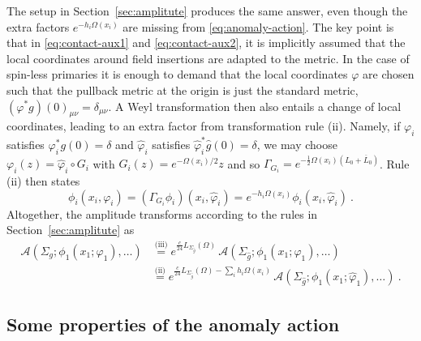 \documentclass[11pt,a4paper]{article}
\numberwithin{equation}{section}
\begin{document}
The setup in Section~\ref{sec:amplitute} produces the same answer, even though the extra factors $e^{-h_i\Omega(x_i)}$ are missing from \eqref{eq:anomaly-action}.
The key point is that in \eqref{eq:contact-aux1} and \eqref{eq:contact-aux2}, it is implicitly assumed that the local coordinates around field insertions are adapted to the metric. In the case of spin-less primaries it is enough to demand that the local coordinates $\varphi$ are chosen such that the pullback metric at the origin is just the standard metric, $(\varphi^* g)(0)_{\mu\nu} = \delta_{\mu\nu}$. 
A Weyl transformation then also entails a change of local coordinates, leading to an extra factor from transformation rule (ii). Namely, if $\varphi_i$ satisfies $\varphi_i^* g(0) = \delta$ and $\hat\varphi_i$ satisfies $\hat\varphi_i^* \hat g(0) = \delta$, we may choose $\varphi_i(z) = \hat\varphi_i \circ G_i$ with $G_i(z) = e^{-\Omega(x_i)/2} z$ and so $\Gamma_{G_i} = e^{-\frac12\Omega(x_i)(L_0+\overline L_0)}$. Rule (ii) then states
\begin{equation}
    \phi_i(x_i,\varphi_i) = (\Gamma_{G_i} \phi_i)(x_i,\hat\varphi_i)
    = e^{-h_i \Omega(x_i)} \phi_i(x_i,\hat\varphi_i) \ .
\end{equation}
Altogether, the amplitude transforms according to the rules in Section~\ref{sec:amplitute} as
\begin{align}
\mathcal{A}\!\left(\Sigma_{g};\phi_1(x_1;\varphi_1),\dots \right) 
&\overset{\text{(iii)}}=
e^{\frac{c}{24}L_{\Sigma_{\hat{g}}}(\Omega)}\,
\mathcal{A}\!\left(\Sigma_{\hat g};\phi_1(x_1;\varphi_1),\dots \right) 
\nonumber \\
&\overset{\text{(ii)}}=
e^{\frac{c}{24}L_{\Sigma_{\hat{g}}}(\Omega)- \sum_i h_i \Omega(x_i)}\,
\mathcal{A}\!\left(\Sigma_{\hat g};\phi_1(x_1;\hat\varphi_1),\dots \right) \ .
\end{align}


\subsection{Some properties of the anomaly action}\label{app:LProperties}
\end{document}
